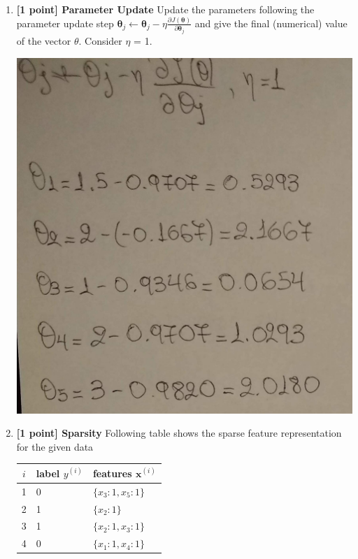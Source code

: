 \documentclass[11pt]{article}
\numberwithin{equation}{section} %
\numberwithin{figure}{section} %
\numberwithin{table}{section} %
\newcommand{\xv}{\mathbf{x}}
\newcommand{\thetav     }{\boldsymbol \theta     }
\begin{document}
\begin{enumerate}
    
    \clearpage
     \item {\bf [1 point] Parameter Update} Update the parameters following the parameter update step $\thetav_j \leftarrow \thetav_j - \eta \frac{\partial J(\thetav)}{\partial \thetav_j}$ and give the final (numerical) value of the vector $\theta$. Consider $\eta$ = 1.
     \begin{solution}
    \includegraphics[scale=0.15]{pic7}
    \end{solution}
    
     \item {\bf  [1 point] Sparsity} Following table shows the sparse feature representation for the given data
     \begin{table}[h]
    \centering
     \begin{tabular}{cll}
    \toprule
    $i$ & {\bf label} $y^{(i)}$ & {\bf features} $\xv^{(i)}$ \\
    \midrule
    1 & 0 &  $\{ x_3: 1, x_5: 1 \}$ \\
    2 & 1 & $\{ x_2: 1 \}$ \\
    3 & 1 & $\{ x_2: 1, x_3: 1 \}$ \\
    4 & 0 & $\{ x_1: 1, x_4: 1 \}$ \\
    

\end{tabular}
\end{table}
\end{enumerate}
\end{document}
